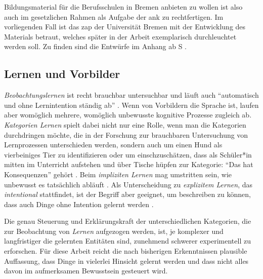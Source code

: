 Bildungsmaterial für die Berufsschulen in Bremen anbieten zu wollen ist also auch im gesetzlichen Rahmen als Aufgabe der \gls{ank} zu rechtfertigen.
Im vorliegenden Fall ist das \gls{zap} der Universität Bremen mit der Entwicklung des Materials betraut, welches später in der Arbeit exemplarisch durchleuchtet werden soll. Zu finden sind die Entwürfe im Anhang ab \gls{S} \pageref{MaterialkartenStart}. 


\subsection{Lernen und Vorbilder \label{lernen}}
\emph{Beobachtungslernen} ist recht brauchbar untersuchbar und läuft auch \enquote{automatisch und ohne Lernintention ständig ab} \autocites[81]{Kiesel2012}[\gls{vgl} zu den bekannteren Anfängen:][]{Bandura.1977}. Wenn von Vorbildern die Sprache ist, laufen aber womöglich mehrere, womöglich unbewusste kognitive Prozesse zugleich ab. \emph{Kategorien Lernen} spielt dabei nicht nur eine Rolle, wenn man die Kategorien durchdringen möchte, die in der Forschung zur brauchbaren Untersuchung von Lernprozessen unterschieden werden, sondern auch um einen Hund als vierbeiniges Tier zu identifizieren oder um einschzuschätzen, dass als Schüler*in mitten im Unterricht aufstehen und über Tische hüpfen zur Kategorie: \enquote{Das hat Konsequenzen} gehört \autocite[95]{Kiesel2012}. Beim \emph{impliziten Lernen} mag umstritten sein, wie unbewusst es tatsächlich abläuft \autocite[83]{Kiesel2012}. Als Unterscheidung zu \emph{explizitem Lernen}, das \emph{intentional} stattfindet, ist der Begriff aber geeignet, um beschreiben zu können, dass auch Dinge ohne Intention gelernt werden \autocite[84]{Kiesel2012}. 

Die genau Steuerung und Erklärungskraft der unterschiedlichen Kategorien, die zur Beobachtung von \emph{Lernen} aufgezogen werden, ist, je komplexer und langfristiger die gelernten Entitäten sind, zunehmend schwerer experimentell zu erforschen. 
Für diese Arbeit reicht die nach bisherigen Erkenntnissen plausible Auffassung, dass Dinge in vielerlei Hinsicht gelernt werden und dass nicht alles davon im aufmerksamen Bewusstsein gesteuert wird. 



